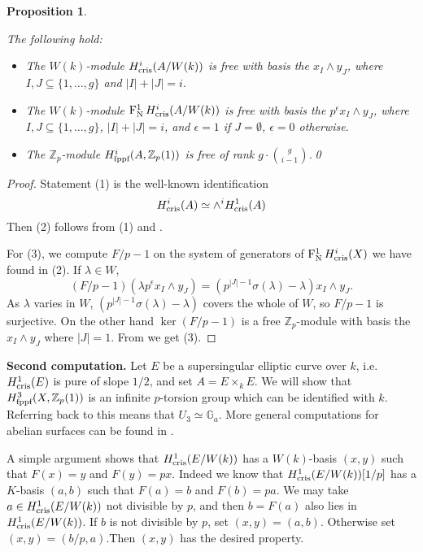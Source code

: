 \documentclass[11pt]{article}
\theoremstyle{plain}
\newtheorem{Prop}[Thm]{Proposition}
\theoremstyle{definition}
\theoremstyle{remark}
\numberwithin{equation}{section}
\newenvironment{propos}[1]%
    { \begin{Prop} \label{P:#1}}%
    { \end{Prop} }
\newcommand{\prop}[1]{\begin{propos}{#1}\sl }
\newcommand{\eprop}{\end{propos}}
\newcommand{\prf}{ \begin{proof} }
\newcommand{\epr}{ \end{proof} }
\newcommand{\Ga}{\mathbb{G}_a}
\newcommand{\Zp}{\mathbb{Z}_p}
\newcommand{\W}{W}                                                       %
\newcommand{\K}{K}
\newcommand\Hflat[1]{H^{#1}_{\textnormal{fppf}}}                         %
\DeclareMathOperator{\Nyg}{F_N^1}                                      %
\newcommand\Hcris[1]{H^{#1}_{\textnormal{cris}}}                         %
\begin{document}
\prop{ordinaria}

The following hold:
\begin{itemize}
    \item[(1)] The $\W(k)$-module $\Hcris{i}(A/\W(k))$ is free with basis the $x_I\wedge y_J$, where $I,J\subseteq\{1,\dots,g\}$ and $|I|+|J|=i$.
    \item[(2)] The $\W(k)$-module $\Nyg\Hcris{i}(A/\W(k))$ is free with basis the $p^{\epsilon}x_I\wedge y_J$, where $I,J\subseteq\{1,\dots,g\}$, $|I|+|J|=i$, and $\epsilon=1$ if $J=\emptyset$, $\epsilon=0$ otherwise.
    \item[(3)] The $\Zp$-module $\Hflat{i}(A,\Zp(1))$ is free of rank $g\cdot\binom{g}{i-1}$.\qed
\end{itemize}

\eprop

\prf

Statement (1) is the well-known identification
\[
\Hcris{i}(A)\simeq\wedge^i\Hcris{1}(A)
\]
Then (2) follows from (1) and . 

For (3), we compute $F/p-1$ on the system of generators of $\Nyg{}\Hcris{i}(X)$ we have found in (2). If $\lambda\in\W$,
\[
(F/p-1)(\lambda p^{\epsilon}x_I\wedge y_J)=(p^{|J|-1}\sigma(\lambda)-\lambda)x_I\wedge y_J.
\]
As $\lambda$ varies in $\W$, $(p^{|J|-1}\sigma(\lambda)-\lambda)$ covers the whole of $\W$, so $F/p-1$ is surjective. On the other hand $\ker\left(F/p-1\right)$ is a free $\Zp$-module with basis the $x_I\wedge y_J$ where $|J|=1$. From  we get (3).
\epr

\vspace{.5em}
\noindent\textbf{Second computation.} Let $E$ be a supersingular elliptic curve over $k$, i.e. $\Hcris{1}(E)$ is pure of slope $1/2$, and set $A=E\times_kE$. We will show that $\Hflat{3}(X,\Zp(1))$ is an infinite $p$-torsion group which can be identified with $k$. Referring back to  this means that $U_3\simeq\Ga$. More general computations for abelian surfaces can be found in \cite[II.7.1]{illusiedrw}.

A simple argument shows that $\Hcris{1}(E/\W(k))$ has a $\W(k)$-basis $(x,y)$ such that $F(x)=y$ and $F(y)=px$. Indeed we know that $\Hcris{1}(E/\W(k))[1/p]$ has a $\K$-basis $(a,b)$ such that $F(a)=b$ and $F(b)=pa$. We may take $a\in\Hcris{1}(E/\W(k))$ not divisible by $p$, and then $b=F(a)$ also lies in $\Hcris{1}(E/\W(k))$. If $b$ is not divisible by $p$, set $(x,y)=(a,b)$. Otherwise set $(x,y)=(b/p,a)$.Then $(x,y)$ has the desired property.
\end{document}

